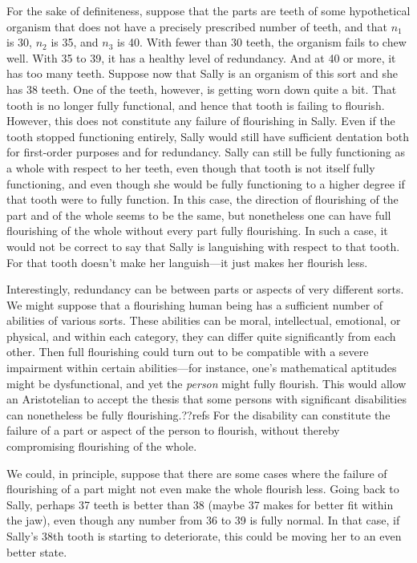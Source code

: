 For the sake of definiteness, suppose that the parts are teeth of some hypothetical organism that does not
have a precisely prescribed number of teeth, and that $n_1$ is 30, $n_2$ is 35, and $n_3$ is 40. With fewer
than 30 teeth, the organism fails to chew well. With 35 to 39, it has a healthy level of redundancy. And at 40 or more,
it has too many teeth. Suppose now that Sally is an organism of this sort and she has 38 teeth. One of the teeth, however,
is getting worn down quite a bit. That tooth is no longer fully functional, and hence that tooth is failing to flourish.
However, this does not constitute any failure of flourishing in Sally. Even if the tooth stopped functioning entirely,
Sally would still have sufficient dentation both for first-order purposes and for redundancy. Sally can still be fully
functioning as a whole with respect to her teeth, even though that tooth is not itself fully functioning, and even though
she would be fully functioning to a higher degree if that tooth were to fully function. In this case, the direction of
flourishing of the part and of the whole seems to be the same, but nonetheless one can have full flourishing of the whole
without every part fully flourishing. In such a case, it would not be correct to say that Sally is languishing with respect
to that tooth. For that tooth doesn't make her languish---it just makes her flourish less.

Interestingly, redundancy can be between parts or aspects of very different sorts. We might suppose that a flourishing human 
being has a sufficient number of abilities of various sorts. These abilities can be moral, intellectual, emotional, or physical, and
within each category, they can differ quite significantly from each other. Then full flourishing could turn out to be compatible with a severe
impairment within certain abilities---for instance, one's mathematical aptitudes might be dysfunctional, and yet the \textit{person} 
might fully flourish. This would allow an Aristotelian to accept the thesis that some persons with significant disabilities can nonetheless
be fully flourishing.??refs For the disability can constitute the failure of a part or aspect of the person to flourish, without
thereby compromising flourishing of the whole. 

We could, in principle, suppose that there are some cases where the failure of flourishing of a part might not even make the 
whole flourish less. Going back to Sally, perhaps 37 teeth is better than 38 (maybe 37 makes for better fit within the jaw),
even though any number from 36 to 39 is fully normal. In that case, if Sally's 38th tooth is starting to deteriorate, this could
be moving her to an even better state. 

